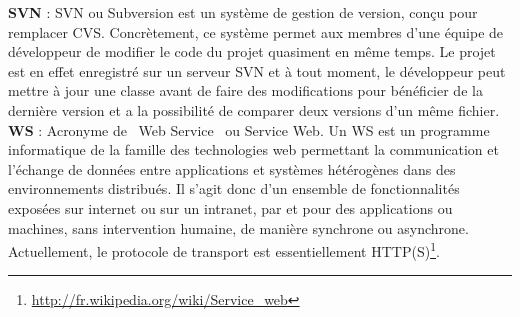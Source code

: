 \documentclass[12pt,openany]{StyleBertrand}
\makeatletter
\providecommand{\og}{\leavevmode\flqq~}%
\providecommand{\fg}{\ifdim\lastskip>\z@\unskip\fi~\frqq}%
\makeatother
\begin{document}
\pagebreak

\textbf{SVN} : SVN ou Subversion est un système de gestion de version, conçu pour remplacer CVS. Concrètement, ce système permet aux membres d’une équipe de développeur de modifier le code du projet quasiment en même temps. Le projet est en effet enregistré sur un serveur SVN et à tout moment, le développeur peut mettre à jour une classe avant de faire des modifications pour bénéficier de la dernière version et a la possibilité de comparer deux versions d'un même fichier.\\

\textbf{WS} : Acronyme de \og Web Service \fg ou Service Web. Un WS est un programme informatique de la famille des technologies web permettant la communication et l'échange de données entre applications et systèmes hétérogènes dans des environnements distribués. Il s'agit donc d'un ensemble de fonctionnalités exposées sur internet ou sur un intranet, par et pour des applications ou machines, sans intervention humaine, de manière synchrone ou asynchrone. Actuellement, le protocole de transport est essentiellement HTTP(S)\footnote{\url{http://fr.wikipedia.org/wiki/Service_web}}. \\
\end{document}

